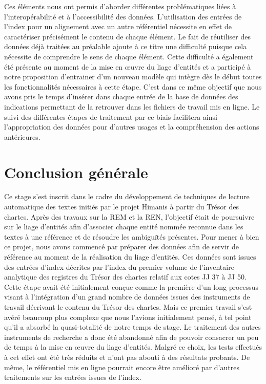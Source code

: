 \documentclass[a4paper,12pt,twoside]{book}
\begin{document}
	Ces éléments nous ont permis d'aborder différentes problématiques liées à l'interopérabilité et à l'accessibilité des données. L'utilisation des entrées de l'index pour un alignement avec un autre référentiel nécessite en effet de caractériser précisément le contenu de chaque élément. Le fait de réutiliser des données déjà traitées au préalable ajoute à ce titre une difficulté puisque cela nécessite de comprendre le sens de chaque élément. Cette difficulté a également été présente au moment de la mise en œuvre du liage d'entités et a participé à notre proposition d'entrainer d'un nouveau modèle qui intègre dès le début toutes les fonctionnalités nécessaires à cette étape. C'est dans ce même objectif que nous avons pris le temps d'insérer dans chaque entrée de la base de données des indications permettant de la retrouver dans les fichiers de travail mis en ligne. Le suivi des différentes étapes de traitement par ce biais facilitera ainsi l'appropriation des données pour d'autres usages et la compréhension des actions antérieures.
	
	
	\chapter*{Conclusion générale}
	
	Ce stage s'est inscrit dans le cadre du développement de techniques de lecture automatique des textes initiés par le projet Himanis à partir du Trésor des chartes. Après des travaux sur la REM et la REN, l'objectif était de poursuivre sur le liage d'entités afin d'associer chaque entité nommée reconnue dans les textes à une référence et de résoudre les ambiguïtés présentes. Pour mener à bien ce projet, nous avons commencé par préparer des données afin de servir de référence au moment de la réalisation du liage d'entités. Ces données sont issues des entrées d'index décrites par l'index du premier volume de l'inventaire analytique des registres du Trésor des chartes relatif aux cotes JJ 37 à JJ 50. Cette étape avait été initialement conçue comme la première d'un long processus visant à l'intégration d'un grand nombre de données issues des instruments de travail décrivant le contenu du Trésor des chartes. Mais ce premier travail s'est avéré beaucoup plus complexe que nous l'avions initialement pensé, à tel point qu'il a absorbé la quasi-totalité de notre temps de stage. Le traitement des autres instruments de recherche a donc été abandonné afin de pouvoir consacrer un peu de temps à la mise en œuvre du liage d'entités. Malgré ce choix, les tests effectués à cet effet ont été très réduits et n'ont pas abouti à des résultats probants. De même, le référentiel mis en ligne pourrait encore être amélioré par d'autres traitements sur les entrées issues de l'index.
	
\end{document}
